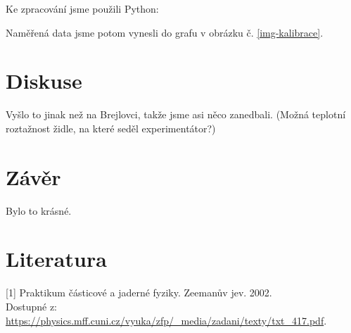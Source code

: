 \documentclass[10pt,a4paper]{article}
\newcommand{\°}{\degree}
\begin{document}
Ke zpracování jsme použili Python:

Naměřená data jsme potom vynesli do grafu v obrázku č. \ref{img-kalibrace}.


\section{Diskuse}
Vyšlo to jinak než na Brejlovci, takže jsme asi něco zanedbali. (Možná teplotní roztažnost židle, na které seděl experimentátor?)

\section{Závěr}
Bylo to krásné.

\section{Literatura}
[1] Praktikum částicové a jaderné fyziky. Zeemanův jev. 2002. \\ Dostupné z: \url{https://physics.mff.cuni.cz/vyuka/zfp/_media/zadani/texty/txt_417.pdf}.
\\[10pt]
\end{document}
